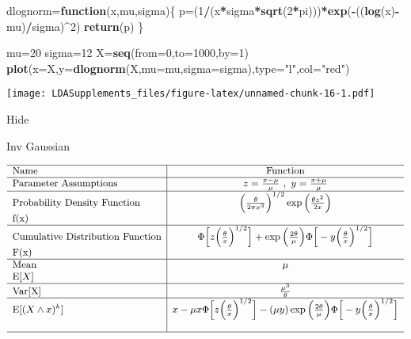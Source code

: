 \documentclass[]{book}
\newenvironment{Shaded}{\begin{snugshade}}{\end{snugshade}}
\newcommand{\KeywordTok}[1]{\textcolor[rgb]{0.13,0.29,0.53}{\textbf{#1}}}
\newcommand{\DataTypeTok}[1]{\textcolor[rgb]{0.13,0.29,0.53}{#1}}
\newcommand{\DecValTok}[1]{\textcolor[rgb]{0.00,0.00,0.81}{#1}}
\newcommand{\StringTok}[1]{\textcolor[rgb]{0.31,0.60,0.02}{#1}}
\newcommand{\ControlFlowTok}[1]{\textcolor[rgb]{0.13,0.29,0.53}{\textbf{#1}}}
\newcommand{\OperatorTok}[1]{\textcolor[rgb]{0.81,0.36,0.00}{\textbf{#1}}}
\newcommand{\NormalTok}[1]{#1}
\begin{document}
\begin{Shaded}
\begin{Highlighting}[]
\NormalTok{dlognorm=}\ControlFlowTok{function}\NormalTok{(x,mu,sigma)\{}
\NormalTok{  p=(}\DecValTok{1}\OperatorTok{/}\NormalTok{(x}\OperatorTok{*}\NormalTok{sigma}\OperatorTok{*}\KeywordTok{sqrt}\NormalTok{(}\DecValTok{2}\OperatorTok{*}\NormalTok{pi)))}\OperatorTok{*}\KeywordTok{exp}\NormalTok{(}\OperatorTok{-}\NormalTok{((}\KeywordTok{log}\NormalTok{(x)}\OperatorTok{-}\NormalTok{mu)}\OperatorTok{/}\NormalTok{sigma)}\OperatorTok{^}\DecValTok{2}\NormalTok{)}
  \KeywordTok{return}\NormalTok{(p)}
\NormalTok{\}}
\end{Highlighting}
\end{Shaded}

\begin{Shaded}
\begin{Highlighting}[]
\NormalTok{mu=}\DecValTok{20}
\NormalTok{sigma=}\DecValTok{12}
\NormalTok{X=}\KeywordTok{seq}\NormalTok{(}\DataTypeTok{from=}\DecValTok{0}\NormalTok{,}\DataTypeTok{to=}\DecValTok{1000}\NormalTok{,}\DataTypeTok{by=}\DecValTok{1}\NormalTok{)}
\KeywordTok{plot}\NormalTok{(}\DataTypeTok{x=}\NormalTok{X,}\DataTypeTok{y=}\KeywordTok{dlognorm}\NormalTok{(X,}\DataTypeTok{mu=}\NormalTok{mu,}\DataTypeTok{sigma=}\NormalTok{sigma),}\DataTypeTok{type=}\StringTok{"l"}\NormalTok{,}\DataTypeTok{col=}\StringTok{"red"}\NormalTok{)}
\end{Highlighting}
\end{Shaded}

\texttt{[image: LDASupplements\_files/figure-latex/unnamed-chunk-16-1.pdf]}

\hypertarget{odB}{}
{Hide}

Inv Gaussian

\[
{\small
\begin{matrix}
\begin{array}{l|c}
\hline
  \text{Name} & \text{Function} \\
\hline
  \text{Parameter Assumptions} & z=\frac{x-\mu}{\mu}~,~y=\frac{x+\mu}{\mu} \\
\hline
  \text{Probability Density Function} & \Big(\frac{\theta}{2\pi x^3}\Big)^{1/2}\exp\Big(\frac{\theta z^2}{2x}\Big) \\
    \text{f(x)} & \\
\hline
  \text{Cumulative Distribution Function} & \Phi\Big[z\Big(\frac{\theta}{x}\Big)^{1/2}\Big]+\exp\Big(\frac{2\theta}{\mu}\Big)\Phi\Big[-y\Big(\frac{\theta}{x}\Big)^{1/2}\Big] \\
    \text{F(x)} & \\
\hline
  \text{Mean} & \mu \\
  \mathrm{E}[X]  & \\
\hline
  \mathrm{Var[X]} & \frac{\mu^3}{\theta}\\
\hline
  \mathrm{E}[(X\wedge x)^k] & x-\mu x\Phi\Big[z\Big(\frac{\theta}{x}\Big)^{1/2}\Big]-(\mu y)\exp\Big(\frac{2\theta}{\mu}\Big)\Phi\Big[-y\Big(\frac{\theta}{x}\Big)^{1/2}\Big] \\
  &  \\
\hline
\end{array}
\end{matrix}
}
\]
\end{document}
